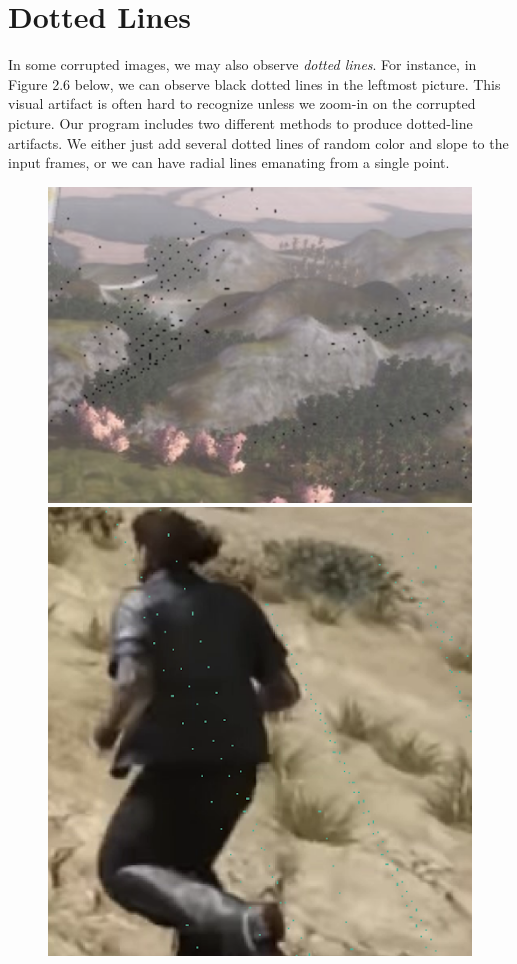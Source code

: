 \section*{Dotted Lines}
In some corrupted images, we may also observe \textit{dotted lines}. For instance, in Figure 2.6 below, we can observe black dotted lines in the leftmost picture. This visual artifact is often hard to recognize unless we zoom-in on the corrupted picture. Our program includes two different methods to produce dotted-line artifacts. We either just add several dotted lines of random color and slope to the input frames, or we can have radial lines emanating from a single point.

\newpage

\begin{figure}[!ht]
\includegraphics[scale=.35]{images/dl1.png}
\includegraphics[scale=.25]{images/dl2.png}

\end{figure}
